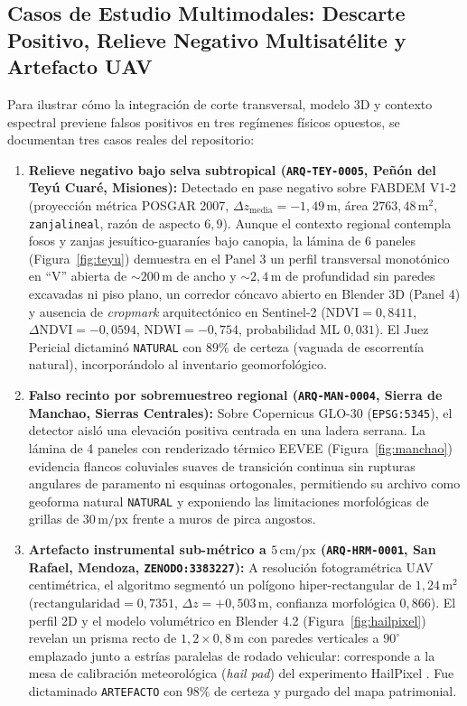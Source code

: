 \documentclass[11pt,a4paper]{article}
\DeclareRobustCommand{\_}{\ifmmode\mbox{\textunderscore}\else\textunderscore\allowbreak\fi}
\begin{document}
\subsection{Casos de Estudio Multimodales: Descarte Positivo, Relieve Negativo Multisat\'elite y Artefacto UAV}

Para ilustrar c\'omo la integraci\'on de corte transversal, modelo 3D y contexto espectral previene falsos positivos en tres reg\'imenes f\'isicos opuestos, se documentan tres casos reales del repositorio:

\begin{enumerate}
  \item \textbf{Relieve negativo bajo selva subtropical (\texttt{ARQ-TEY-0005}, Pe\~n\'on del Tey\'u Cuar\'e, Misiones):} Detectado en pase negativo sobre FABDEM V1-2 (proyecci\'on m\'etrica POSGAR 2007, $\Delta z_{\mathrm{media}} = -1{,}49\,\mathrm{m}$, \'area $2763{,}48\,\mathrm{m}^2$, \texttt{zanja\_lineal}, raz\'on de aspecto $6{,}9$). Aunque el contexto regional contempla fosos y zanjas jesu\'itico-guaran\'ies bajo canopia, la l\'amina de 6 paneles (Figura~\ref{fig:teyu}) demuestra en el Panel 3 un perfil transversal monot\'onico en ``V'' abierta de $\sim 200\,\mathrm{m}$ de ancho y $\sim 2{,}4\,\mathrm{m}$ de profundidad sin paredes excavadas ni piso plano, un corredor c\'oncavo abierto en Blender 3D (Panel 4) y ausencia de \emph{cropmark} arquitect\'onico en Sentinel-2 ($\mathrm{NDVI}=0{,}8411$, $\Delta\mathrm{NDVI}=-0{,}0594$, $\mathrm{NDWI}=-0{,}754$, probabilidad ML $0{,}031$). El Juez Pericial dictamin\'o \texttt{NATURAL} con $89\%$ de certeza (vaguada de escorrent\'ia natural), incorpor\'andolo al inventario geomorfol\'ogico.
  \item \textbf{Falso recinto por sobremuestreo regional (\texttt{ARQ-MAN-0004}, Sierra de Manchao, Sierras Centrales):} Sobre Copernicus GLO-30 (\texttt{EPSG:5345}), el detector aisl\'o una elevaci\'on positiva centrada en una ladera serrana. La l\'amina de 4 paneles con renderizado t\'ermico EEVEE (Figura~\ref{fig:manchao}) evidencia flancos coluviales suaves de transici\'on continua sin rupturas angulares de paramento ni esquinas ortogonales, permitiendo su archivo como geoforma natural \texttt{NATURAL} y exponiendo las limitaciones morfol\'ogicas de grillas de $30\,\mathrm{m/px}$ frente a muros de pirca angostos.
  \item \textbf{Artefacto instrumental sub-m\'etrico a $5\,\mathrm{cm/px}$ (\texttt{ARQ-HRM-0001}, San Rafael, Mendoza, \texttt{ZENODO:3383227}):} A resoluci\'on fotogram\'etrica UAV centim\'etrica, el algoritmo segment\'o un pol\'igono hiper-rectangular de $1{,}24\,\mathrm{m}^2$ ($\text{rectangularidad}=0{,}7351$, $\Delta z = +0{,}503\,\mathrm{m}$, confianza morfol\'ogica $0{,}866$). El perfil 2D y el modelo volum\'etrico en Blender 4.2 (Figura~\ref{fig:hailpixel}) revelan un prisma recto de $1{,}2\times 0{,}8\,\mathrm{m}$ con paredes verticales a $90^\circ$ emplazado junto a estr\'ias paralelas de rodado vehicular: corresponde a la mesa de calibraci\'on meteorol\'ogica (\emph{hail pad}) del experimento HailPixel \citep{Soderholm2019}. Fue dictaminado \texttt{ARTEFACTO} con $98\%$ de certeza y purgado del mapa patrimonial.
\end{enumerate}
\end{document}
